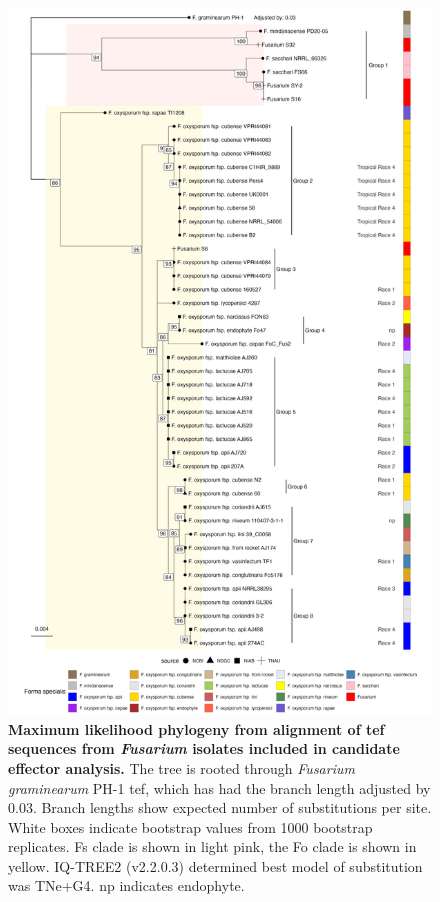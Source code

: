 \begin{figure}[hp!]
    \centering
    \includegraphics[width=12cm]{Figures/BasicTEFPhylo.png}
    \captionsetup{width=\textwidth}
    \caption[Maximum likelihood phylogeny from alignment of \Acl{tef} sequences from \textit{Fusarium} isolates included in candidate effector analysis.]{\textbf{Maximum likelihood phylogeny from alignment of \Acf{tef} sequences from \textit{Fusarium} isolates included in candidate effector analysis.} The tree is rooted through \textit{Fusarium graminearum} PH-1 \ac{tef}, which has had the branch length adjusted by 0.03. Branch lengths show expected number of substitutions per site. White boxes indicate bootstrap values from 1000 bootstrap replicates. \acl{Fs} clade is shown in light pink, the \ac{Fo} clade is shown in yellow. IQ-TREE2 (v2.2.0.3) determined best model of substitution was TNe+G4. np indicates endophyte.}
    \label{fig:TEF1aPhyloaMaei}
\end{figure}

